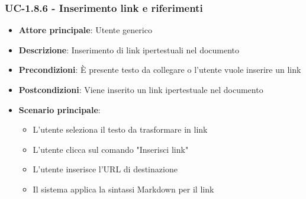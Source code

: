 \documentclass[11pt,a4paper]{article}
\begin{document}
\subsubsection{UC-1.8.6 - Inserimento link e riferimenti}
\begin{itemize}
    \item \textbf{Attore principale}: Utente generico
    \item \textbf{Descrizione}: Inserimento di link ipertestuali nel documento
    \item \textbf{Precondizioni}: È presente testo da collegare o l'utente vuole inserire un link
    \item \textbf{Postcondizioni}: Viene inserito un link ipertestuale nel documento
    \item \textbf{Scenario principale}:
        \begin{itemize}
            \item L'utente seleziona il testo da trasformare in link
            \item L'utente clicca sul comando "Inserisci link"
            \item L'utente inserisce l'URL di destinazione
            \item Il sistema applica la sintassi Markdown per il link
        \end{itemize}
\end{itemize}
\end{document}
